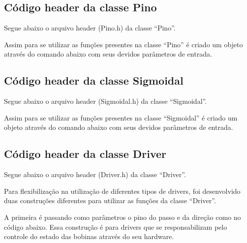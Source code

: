 \subsection{Código header da classe Pino}\label{subsec:respino}

Segue abaixo o arquivo header (Pino.h) da classe “Pino”.

{

Assim para se utilizar as funções presentes na classe “Pino” é criado um objeto 
através do comando abaixo com seus devidos parâmetros de entrada.



\subsection{Código header da classe Sigmoidal}\label{subsec:ressigmoidal}

Segue abaixo o arquivo header (Sigmoidal.h) da classe “Sigmoidal”.



Assim para se utilizar as funções presentes na classe “Sigmoidal” é criado um objeto 
através do comando abaixo com seus devidos parâmetros de entrada.



\subsection{Código header da classe Driver}\label{subsec:resdriver}
Segue abaixo o arquivo header (Driver.h) da classe “Driver”.



Para flexibilização na utilização de diferentes tipos de drivers, foi desenvolvido 
duas construções diferentes para utilizar as funções da classe “Driver”.

A primeira é passando como parâmetros o pino do passo e da direção como no código abaixo.
Essa construção é para drivers que se responsabilizam pelo controle do estado 
das bobinas através do seu hardware.

}
